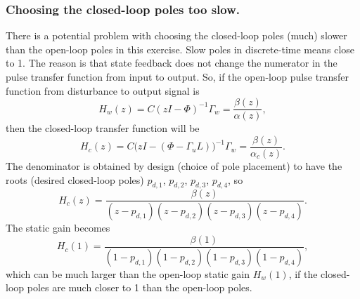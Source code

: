 \documentclass[a4paper]{scrartcl}
\begin{document}
\subsubsection*{Choosing the closed-loop poles too slow.}
\label{sec-3-2-6}
There is a potential problem with choosing the closed-loop poles (much) slower than the open-loop poles in this exercise. Slow poles in discrete-time means close to 1. The reason is that state feedback does not change the numerator in the pulse transfer function from input to output.  So, if the open-loop pulse transfer function from disturbance to output signal is
\[ H_w(z) = C (zI-\Phi)^{-1} \Gamma_w = \frac{\beta(z)}{\alpha(z)},\]
then the closed-loop transfer function will be 
\[ H_c(z) = C \big(zI -(\Phi-\Gamma_u L)\big)^{-1}\Gamma_w = \frac{\beta(z)}{\alpha_c(z)}.\]
The denominator is obtained by design (choice of pole placement) to have the roots (desired closed-loop poles) \(p_{d,1}\),  \(p_{d,2}\),  \(p_{d,3}\),  \(p_{d,4}\), so   
\[ H_c(z) = \frac{\beta(z)}{(z-p_{d,1})(z-p_{d,2})(z-p_{d,3})(z-p_{d,4})}.\]
The static gain becomes
\[ H_c(1) = \frac{\beta(1)}{(1-p_{d,1})(1-p_{d,2})(1-p_{d,3})(1-p_{d,4})},\]
which can be much larger than the open-loop static gain \(H_w(1)\), if the closed-loop poles are much closer to 1 than the open-loop poles. 
\end{document}
